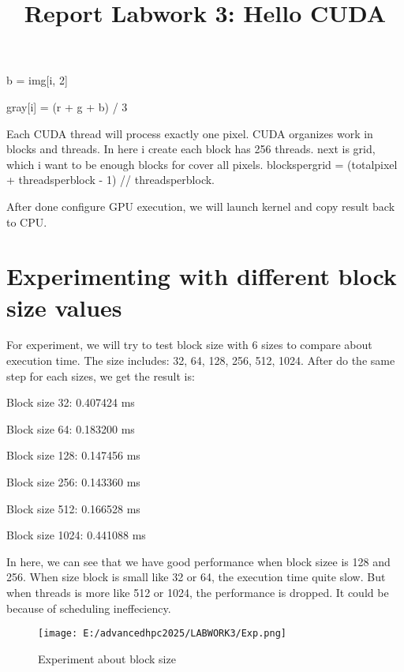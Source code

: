 \documentclass{article} \title{Report Labwork 3: Hello CUDA}
\begin{document}
        b = img[i, 2]

        gray[i] = (r + g + b) / 3

Each CUDA thread will process exactly one pixel. CUDA organizes work in blocks and threads. In here i create each block has 256 threads. next is grid, which i want to be enough blocks for cover all pixels.
blockspergrid = (totalpixel + threadsperblock - 1) // threadsperblock.

After done configure GPU execution, we will launch kernel and copy result back to CPU.
\section{Experimenting with different block size values}

For experiment, we will try to test block size with 6 sizes to compare about execution time. The size includes: 32, 64, 128, 256, 512, 1024.
After do the same step for each sizes, we get the result is: 

Block size 32: 0.407424 ms

Block size 64: 0.183200 ms

Block size 128: 0.147456 ms

Block size 256: 0.143360 ms

Block size 512: 0.166528 ms

Block size 1024: 0.441088 ms

In here, we can see that we have good performance when block sizee is 128 and 256. When size block is small like 32 or 64, the execution time quite slow. But when threads is more like 512 or 1024, the performance is dropped.
It could be because of  scheduling ineffeciency.
\begin{figure}[h]
    \centering
    \texttt{[image: E:/advancedhpc2025/LABWORK3/Exp.png]}
    \caption{Experiment about block size}
    \label{fig:gray-sample}
\end{figure}
\end{document}
